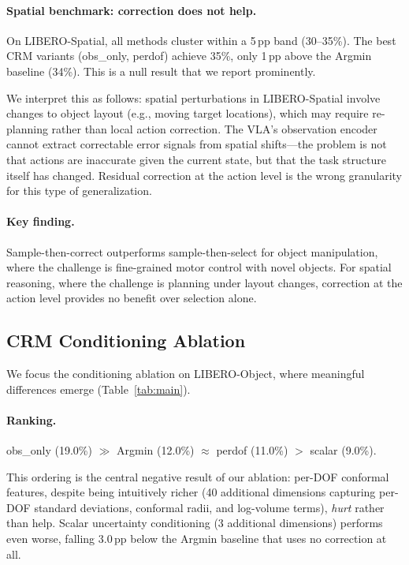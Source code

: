 \paragraph{Spatial benchmark: correction does not help.}
On LIBERO-Spatial, all methods cluster within a 5\,pp band (30--35\%).
The best CRM variants (obs\_only, perdof) achieve 35\%, only 1\,pp above the Argmin baseline (34\%).
This is a null result that we report prominently.

We interpret this as follows: spatial perturbations in LIBERO-Spatial involve changes to object layout (e.g., moving target locations), which may require re-planning rather than local action correction.
The VLA's observation encoder cannot extract correctable error signals from spatial shifts---the problem is not that actions are inaccurate given the current state, but that the task structure itself has changed.
Residual correction at the action level is the wrong granularity for this type of generalization.

\paragraph{Key finding.}
Sample-then-correct outperforms sample-then-select for object manipulation, where the challenge is fine-grained motor control with novel objects.
For spatial reasoning, where the challenge is planning under layout changes, correction at the action level provides no benefit over selection alone.


\subsection{CRM Conditioning Ablation}
\label{sec:ablation}

We focus the conditioning ablation on LIBERO-Object, where meaningful differences emerge (Table~\ref{tab:main}).

\paragraph{Ranking.}
obs\_only (19.0\%) $\gg$ Argmin (12.0\%) $\approx$ perdof (11.0\%) $>$ scalar (9.0\%).

This ordering is the central negative result of our ablation: per-DOF conformal features, despite being intuitively richer (40 additional dimensions capturing per-DOF standard deviations, conformal radii, and log-volume terms), \emph{hurt} rather than help.
Scalar uncertainty conditioning (3 additional dimensions) performs even worse, falling 3.0\,pp below the Argmin baseline that uses no correction at all.

